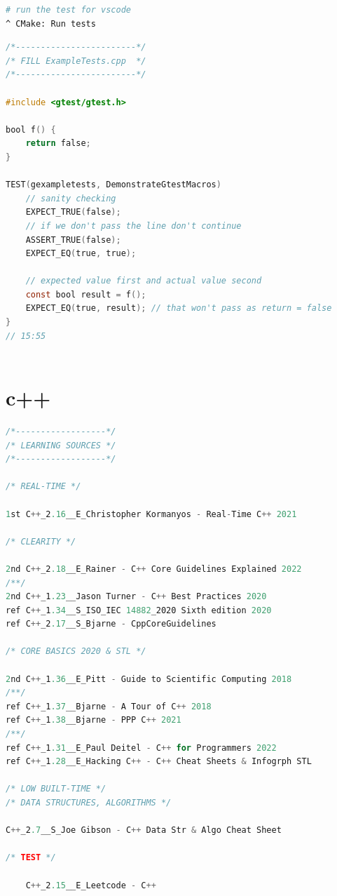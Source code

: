 \documentclass[8pt]{extarticle}
\begin{document}
\begin{small}
\begin{multicols}{2}
\begin{lstlisting}[language=bash]
# run the test for vscode
^ CMake: Run tests
\end{lstlisting}

\begin{lstlisting}[language=C]
/*------------------------*/
/* FILL ExampleTests.cpp  */
/*------------------------*/

#include <gtest/gtest.h>

bool f() {
	return false;
}

TEST(gexampletests, DemonstrateGtestMacros)
	// sanity checking
	EXPECT_TRUE(false);
	// if we don't pass the line don't continue
	ASSERT_TRUE(false);
	EXPECT_EQ(true, true);
	
	// expected value first and actual value second
	const bool result = f();
	EXPECT_EQ(true, result); // that won't pass as return = false
}
// 15:55
	
\end{lstlisting}


\vfill\null
\columnbreak

\section{c++}

\begin{lstlisting}[language=C]
/*------------------*/
/* LEARNING SOURCES */
/*------------------*/

/* REAL-TIME */

1st	C++_2.16__E_Christopher Kormanyos - Real-Time C++ 2021
	
/* CLEARITY */
	
2nd	C++_2.18__E_Rainer - C++ Core Guidelines Explained 2022
/**/
2nd C++_1.23__Jason Turner - C++ Best Practices 2020
ref	C++_1.34__S_ISO_IEC 14882_2020 Sixth edition 2020
ref	C++_2.17__S_Bjarne - CppCoreGuidelines
	
/* CORE BASICS 2020 & STL */

2nd	C++_1.36__E_Pitt - Guide to Scientific Computing 2018
/**/
ref C++_1.37__Bjarne - A Tour of C++ 2018
ref C++_1.38__Bjarne - PPP C++ 2021
/**/
ref C++_1.31__E_Paul Deitel - C++ for Programmers 2022
ref C++_1.28__E_Hacking C++ - C++ Cheat Sheets & Infogrph STL

/* LOW BUILT-TIME */
/* DATA STRUCTURES, ALGORITHMS */

C++_2.7__S_Joe Gibson - C++ Data Str & Algo Cheat Sheet

/* TEST */

	C++_2.15__E_Leetcode - C++
	

\end{lstlisting}
\end{multicols}
\end{small}
\end{document}
